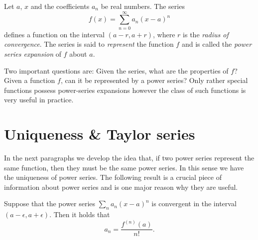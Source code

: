 


Let \(a\), \(x\) and the coefficients \(a_n\) be real numbers.
The series
\[
  f(x) = \sum_{n=0}^{\infty} a_n {(x-a)}^n
\]
defines a function on the interval \((a-r,a+r)\),
where  \(r\)  is the \emph{radius of convergence}.
%
The series is said to \emph{represent} the function \(f\)
and is called the \emph{power series expansion} of \(f\) about \(a\).

Two important questions are: Given the series, what are the properties of \(f\)?
Given a function \(f\), can it be represented by a power series?
Only rather special functions possess power-series expansions however the class of such functions is very useful in practice.



\section{Uniqueness \& Taylor series}

In the next paragraphs we develop the idea that, if two power series represent the same function, then they must be the same power series.
In this sense we have the uniqueness of power series.
The following result is a crucial piece of information about power series and is one major reason why they are useful.

\begin{theorem}
  Suppose that the power series $\sum_n a_n (x-a)^n$ is convergent in the interval $(a-\epsilon, a+\epsilon)$.
  Then it holds that
  \[
    a_n =  \frac{f^{(n)}(a)}{n!}.
  \]
\end{theorem}

